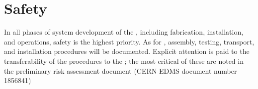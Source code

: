 \section{Safety}
\label{sec:fddp-hv-safety}



%

%

In all phases of  system development of the \dpmod, including fabrication, installation, and operations, safety is the highest priority.  %
As for , assembly, testing, transport, and installation procedures will be documented. Explicit attention is paid to the transferability of the  procedures to the \dpmod; the most critical of these are noted in the preliminary   risk assessment document (CERN EDMS document number 1856841)  


